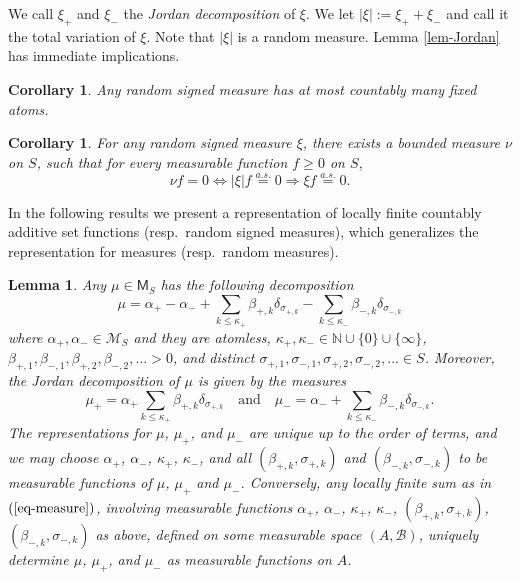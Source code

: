 \documentclass{article}
\theoremstyle{plain}
\newtheorem{lemma}[theorem]{Lemma}
\newtheorem{corollary}[theorem]{Corollary}
\theoremstyle{remark}
\begin{document}
We call $\xi_+$ and $\xi_-$ the\textit{ Jordan decomposition} of $\xi$. We let $|\xi|:=\xi_+ +\xi_-$ and call it the total variation of $\xi$. Note that $|\xi|$ is a random measure. Lemma \ref{lem-Jordan} has immediate implications.


\begin{corollary}\label{co-atom}
	Any random signed measure has at most countably many fixed atoms.
\end{corollary}

\begin{corollary}\label{co-uncited-3}
	For any random signed measure $\xi$, there exists a bounded measure $\nu$ on $S$, such that for every measurable function $f \geq 0$ on $S$,
	\begin{equation*}
		\nu f=0\Leftrightarrow|\xi|f\stackrel{a.s.}{=}0\Rightarrow \xi f\stackrel{a.s.}{=}0.
	\end{equation*}
\end{corollary}

In the following results we present a representation of locally finite countably additive set functions (resp.~random signed measures), which generalizes the representation for measures (resp.~random measures).
\begin{lemma}\label{lem-deterministic-representation}
	Any $\mu\in\mathsf{M}_S$ has the following decomposition
	\begin{equation}\label{eq-measure}
		\mu=\alpha_+-\alpha_-+\sum_{k\leq\kappa_+}\beta_{+,k}\delta_{\sigma_{+,k}}-\sum_{k\leq\kappa_-}\beta_{-,k}\delta_{\sigma_{-,k}}
	\end{equation}
	where $\alpha_+,\alpha_-\in\mathcal{M}_S$ and they are atomless, $\kappa_+,\kappa_-\in\mathbb{N}\cup\{0\}\cup\{\infty\}$, $\beta_{+,1},\beta_{-,1},\beta_{+,2},\beta_{-,2},...>0$, and distinct $\sigma_{+,1},\sigma_{-,1},\sigma_{+,2},\sigma_{-,2},...\in S$. Moreover, the Jordan decomposition of $\mu$ is given by the measures
	\begin{equation*}
		\mu_+=\alpha_+\sum_{k\leq\kappa_+}\beta_{+,k}\delta_{\sigma_{+,k}}\quad\text{and}\quad \mu_-=\alpha_-+\sum_{k\leq\kappa_-}\beta_{-,k}\delta_{\sigma_{-,k}}.
	\end{equation*}
	The representations for $\mu$, $\mu_+$, and $\mu_-$ are unique up to the order of terms, and we may choose $\alpha_+$, $\alpha_-$, $\kappa_+$, $\kappa_-$, and all $(\beta_{+,k},\sigma_{+,k})$ and  $(\beta_{-,k},\sigma_{-,k})$ to be measurable functions of $\mu$, $\mu_+$ and $\mu_-$. Conversely, any locally finite sum as in $(\ref{eq-measure})$, involving measurable functions $\alpha_+$, $\alpha_-$, $\kappa_+$, $\kappa_-$, $(\beta_{+,k},\sigma_{+,k})$, $(\beta_{-,k},\sigma_{-,k})$ as above, defined on some measurable space $(A,\mathcal{B})$, uniquely determine $\mu$, $\mu_+$, and $\mu_-$ as measurable functions on $A$.
\end{lemma}
\end{document}
